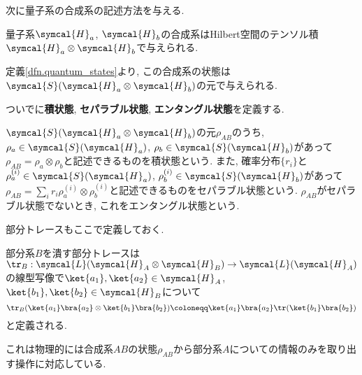 

次に量子系の合成系の記述方法を与える. 
\begin{mydfn}[合成系]\label{dfn.composite_system}
  量子系$\symcal{H}_a$, $\symcal{H}_b$の合成系はHilbert空間のテンソル積$\symcal{H}_a\otimes\symcal{H}_b$で与えられる. 
\end{mydfn}
定義\ref{dfn.quantum_states}より, この合成系の状態は$\symcal{S}(\symcal{H}_a\otimes\symcal{H}_b)$の元で与えられる. 

ついでに\textbf{積状態}, \textbf{セパラブル状態}, \textbf{エンタングル状態}を定義する. 

\begin{mydfn}
  $\symcal{S}(\symcal{H}_a\otimes\symcal{H}_b)$の元$\rho_{AB}$のうち, $\rho_a\in\symcal{S}(\symcal{H}_a)$, $\rho_b\in\symcal{S}(\symcal{H}_b)$があって$\rho_{AB}=\rho_a\otimes\rho_b$と記述できるものを積状態という. 
  また, 確率分布$\{r_i\}$と$\rho_a^{(i)}\in\symcal{S}(\symcal{H}_a)$, $\rho_b^{(i)}\in\symcal{S}(\symcal{H}_b)$があって$\rho_{AB}=\sum_{i}r_i\rho_a^{(i)}\otimes\rho_b^{(i)}$と記述できるものをセパラブル状態という. 
  $\rho_{AB}$がセパラブル状態でないとき, これをエンタングル状態という. 
\end{mydfn}

部分トレースもここで定義しておく. 
\begin{mydfn}[部分トレース]\label{dfn.partial_trace}
  部分系$B$を潰す部分トレースは$\tr_B:\symcal{L}(\symcal{H}_A\otimes \symcal{H}_B)\to \symcal{L}(\symcal{H}_A)$の線型写像で$\ket{a_1}, \ket{a_2}\in\symcal{H}_A$, $\ket{b_1}, \ket{b_2}\in\symcal{H}_B$について
  \begin{equation}
    \tr_B(\ket{a_1}\bra{a_2}\otimes\ket{b_1}\bra{b_2})\coloneqq\ket{a_1}\bra{a_2}\tr(\ket{b_1}\bra{b_2})
  \end{equation}
  と定義される. 
\end{mydfn}
これは物理的には合成系$AB$の状態$\rho_{AB}$から部分系$A$についての情報のみを取り出す操作に対応している. 
